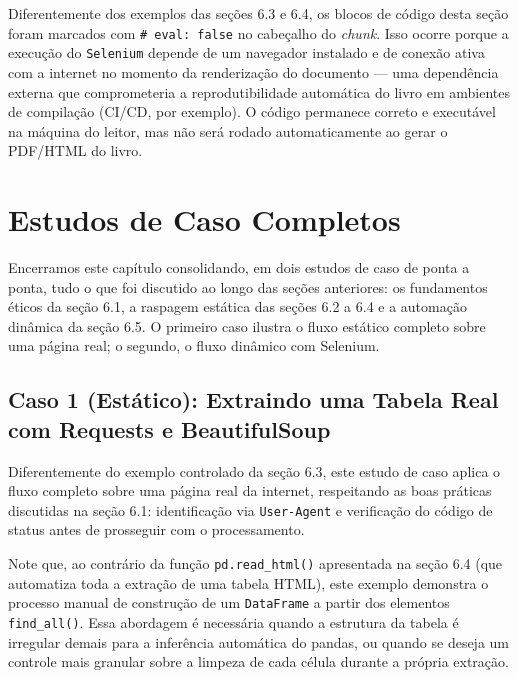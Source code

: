 \documentclass[
  brazilian,
  letterpaper,
  DIV=11,
  numbers=noendperiod]{scrreprt}
\begin{document}
Diferentemente dos exemplos das seções 6.3 e 6.4, os blocos de código
desta seção foram marcados com \texttt{\#\textbar{}\ eval:\ false} no
cabeçalho do \emph{chunk}. Isso ocorre porque a execução do
\texttt{Selenium} depende de um navegador instalado e de conexão ativa
com a internet no momento da renderização do documento --- uma
dependência externa que comprometeria a reprodutibilidade automática do
livro em ambientes de compilação (CI/CD, por exemplo). O código
permanece correto e executável na máquina do leitor, mas não será rodado
automaticamente ao gerar o PDF/HTML do livro.

\section{Estudos de Caso Completos}\label{estudos-de-caso-completos}

Encerramos este capítulo consolidando, em dois estudos de caso de ponta
a ponta, tudo o que foi discutido ao longo das seções anteriores: os
fundamentos éticos da seção 6.1, a raspagem estática das seções 6.2 a
6.4 e a automação dinâmica da seção 6.5. O primeiro caso ilustra o fluxo
estático completo sobre uma página real; o segundo, o fluxo dinâmico com
Selenium.

\subsection{Caso 1 (Estático): Extraindo uma Tabela Real com Requests e
BeautifulSoup}\label{caso-1-estuxe1tico-extraindo-uma-tabela-real-com-requests-e-beautifulsoup}

Diferentemente do exemplo controlado da seção 6.3, este estudo de caso
aplica o fluxo completo sobre uma página real da internet, respeitando
as boas práticas discutidas na seção 6.1: identificação via
\texttt{User-Agent} e verificação do código de status antes de
prosseguir com o processamento.

Note que, ao contrário da função \texttt{pd.read\_html()} apresentada na
seção 6.4 (que automatiza toda a extração de uma tabela HTML), este
exemplo demonstra o processo manual de construção de um
\texttt{DataFrame} a partir dos elementos \texttt{find\_all()}. Essa
abordagem é necessária quando a estrutura da tabela é irregular demais
para a inferência automática do pandas, ou quando se deseja um controle
mais granular sobre a limpeza de cada célula durante a própria extração.
\end{document}

